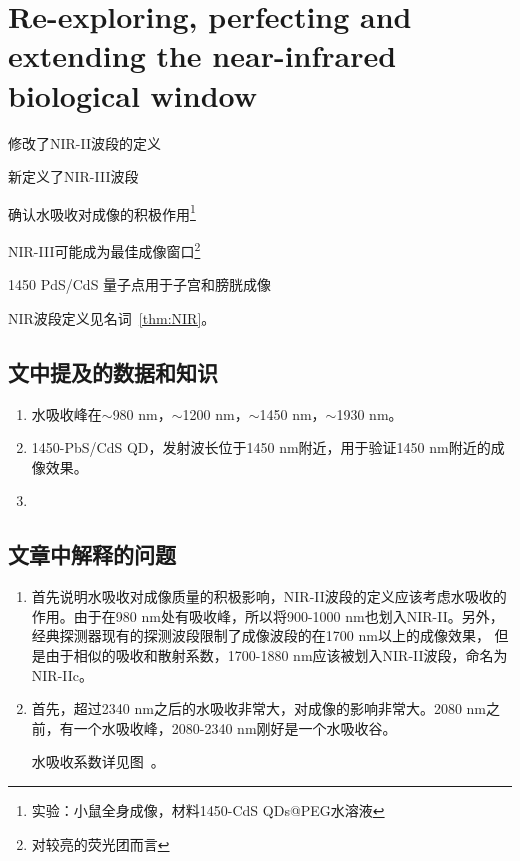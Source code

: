 \documentclass[cn,11pt,chinese]{elegantbook}
\begin{document}
\section{Re-exploring, perfecting and extending the near-infrared biological window}
\begin{introduction}[创新点概要]
  \item 修改了NIR-II波段的定义
  \item 新定义了NIR-III波段
  \item 确认水吸收对成像的积极作用\footnote{实验：小鼠全身成像，材料1450-CdS QDs@PEG水溶液}
  \item NIR-III可能成为最佳成像窗口\footnote{对较亮的荧光团而言}
  \item 1450 PdS/CdS 量子点用于子宫和膀胱成像
\end{introduction}
\begin{note}
  NIR波段定义见名词~\vref{thm:NIR}。
\end{note}
\subsection{文中提及的数据和知识}
\begin{enumerate}
  \item 水吸收峰在$\sim$980 nm，$\sim$1200 nm，$\sim$1450 nm，$\sim$1930 nm。
  \item 1450-PbS/CdS QD，发射波长位于1450 nm附近，用于验证1450 nm附近的成像效果。
  \item 
\end{enumerate}

\subsection{文章中解释的问题}
 \begin{enumerate}[itemsep=1.5ex]
   \item {}
   首先说明水吸收对成像质量的积极影响，NIR-II波段的定义应该考虑水吸收的作用。由于在980 nm处有吸收峰，所以将900-1000 nm也划入NIR-II。另外，
   经典探测器现有的探测波段限制了成像波段的在1700 nm以上的成像效果，
   但是由于相似的吸收和散射系数，1700-1880 nm应该被划入NIR-II波段，命名为NIR-IIc。
   \item {}
  首先，超过2340 nm之后的水吸收非常大，对成像的影响非常大。2080 nm之前，有一个水吸收峰，2080-2340 nm刚好是一个水吸收谷。
  \begin{note}
    水吸收系数详见图~。
  \end{note}
 \end{enumerate} 
\end{document}
